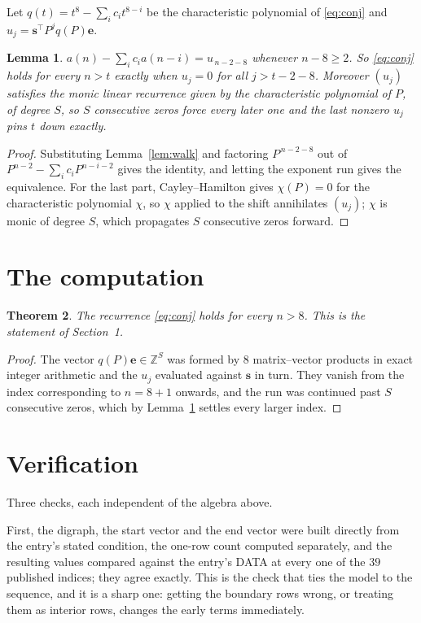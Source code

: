 \documentclass[11pt,a4paper]{article}
\theoremstyle{plain}
\newtheorem{theorem}{Theorem}
\newtheorem{lemma}[theorem]{Lemma}
\theoremstyle{definition}
\begin{document}
Let $q(t)=t^{8}-\sum_i c_i t^{8-i}$ be the characteristic polynomial of
\eqref{eq:conj} and $u_j=\mathbf{s}^{\!\top}P^{j}q(P)\mathbf{e}$.

\begin{lemma}\label{lem:crit}
$a(n)-\sum_i c_i a(n-i)=u_{\,n-2-8}$ whenever $n-8\ge2$. So \eqref{eq:conj}
holds for every $n>t$ exactly when $u_j=0$ for all $j>t-2-8$. Moreover $(u_j)$
satisfies the monic linear recurrence given by the characteristic polynomial of $P$, of
degree $S$, so $S$ consecutive zeros force every later one and the last nonzero $u_j$ pins
$t$ down exactly.
\end{lemma}

\begin{proof}
Substituting Lemma~\ref{lem:walk} and factoring $P^{\,n-2-8}$ out of
$P^{n-2}-\sum_i c_i P^{n-i-2}$ gives the identity, and letting the exponent run gives the
equivalence. For the last part, Cayley--Hamilton gives $\chi(P)=0$ for the characteristic
polynomial $\chi$, so $\chi$ applied to the shift annihilates $(u_j)$; $\chi$ is monic of
degree $S$, which propagates $S$ consecutive zeros forward.
\end{proof}

\section{The computation}

\begin{theorem}
The recurrence \eqref{eq:conj} holds for every $n>8$. This is the statement of
Section~1.
\end{theorem}

\begin{proof}
The vector $q(P)\mathbf{e}\in\mathbb{Z}^{S}$ was formed by $8$ matrix--vector
products in exact integer arithmetic and the $u_j$ evaluated against $\mathbf{s}$ in turn.
They vanish from the index corresponding to $n=8+1$ onwards, and the run was continued
past $S$ consecutive zeros, which by Lemma~\ref{lem:crit} settles every larger index.
\end{proof}

\section{Verification}

Three checks, each independent of the algebra above.

First, the digraph, the start vector and the end vector were built directly from the
entry's stated condition, the one-row count computed separately, and the resulting values
compared against the entry's DATA at every one of the $39$ published indices; they
agree exactly. This is the check that ties the model to the sequence, and it is a sharp one:
getting the boundary rows wrong, or treating them as interior rows, changes the early terms
immediately.
\end{document}
